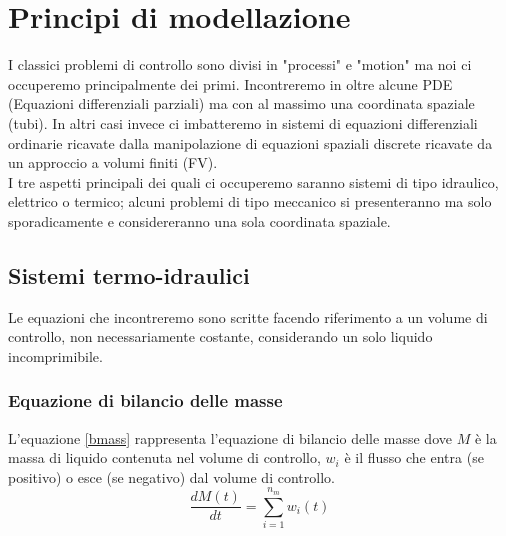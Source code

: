 ﻿\label{capitolo2}
\section{Principi di modellazione}
I classici problemi di controllo sono divisi in "processi" e "motion" ma noi ci occuperemo principalmente dei primi. Incontreremo in oltre alcune PDE (Equazioni differenziali parziali) ma con al massimo una coordinata spaziale (tubi). In altri casi invece ci imbatteremo in sistemi di equazioni differenziali ordinarie ricavate dalla manipolazione di equazioni spaziali discrete ricavate da un approccio a volumi finiti (FV).\\
I tre aspetti principali dei quali ci occuperemo saranno sistemi di tipo idraulico, elettrico o termico; alcuni problemi di tipo meccanico si presenteranno ma solo sporadicamente e considereranno una sola coordinata spaziale.
\subsection{Sistemi termo-idraulici}
Le equazioni che incontreremo sono scritte facendo riferimento a un volume di controllo, non necessariamente costante, considerando un solo liquido incomprimibile.
\subsubsection{Equazione di bilancio delle masse}
L'equazione \ref{bmass} rappresenta l'equazione di bilancio delle masse dove $M$ è la massa di liquido contenuta nel volume di controllo, $w_i$ è il flusso che entra (se positivo) o esce (se negativo) dal volume di controllo.
\begin{equation}
\label{bmass}
\frac{dM(t)}{dt}=\sum_{i=1}^{n_m}w_i(t)
\end{equation}
